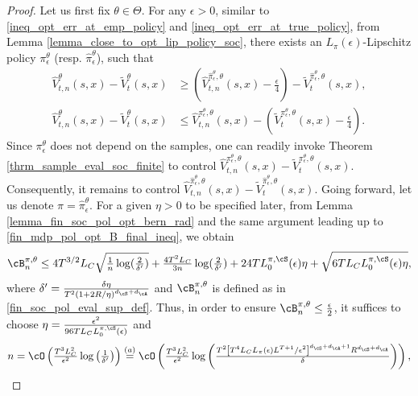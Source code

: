 \documentclass[9pt]{article}
\numberwithin{equation}{section}
\begin{document}
\begin{proof}
    Let us first fix $\theta \in \Theta$. For any $\epsilon > 0$,  similar to \eqref{ineq_opt_err_at_emp_policy} and \eqref{ineq_opt_err_at_true_policy}, from Lemma \ref{lemma_close_to_opt_lip_policy_soc}, there exists an $L_\pi(\epsilon)$-Lipschitz policy $\pi_\epsilon^\theta$ (resp. $\hat{\pi}_\epsilon^\theta$), such that
    \begin{align}
        \hat{V}_{t,n}^{\theta}(s,x) - \tilde{V}_t^{\theta}(s,x) & \geq (\hat{V}_{t,n}^{\hat{\pi}_\epsilon^\theta, \theta}(s,x) - \tfrac{\epsilon}{4}) - \tilde{V}_t^{\hat{\pi}_\epsilon^\theta, \theta}(s,x), \label{fin_soc_pol_opt_close_comp_emp} \\
        \hat{V}_{t,n}^{\theta}(s,x) - \tilde{V}_t^{\theta}(s,x) & \leq \hat{V}_{t,n}^{\pi_\epsilon^\theta, \theta}(s,x)  - (\tilde{V}_t^{\pi_\epsilon^\theta, \theta}(s,x) - \tfrac{\epsilon}{4}). \label{fin_soc_pol_opt_close_comp_real}
    \end{align}
    Since $\pi_\epsilon^\theta$ does not depend on the samples, 
    one can readily invoke Theorem \ref{thrm_sample_eval_soc_finite} to control 
    $\hat{V}_{t,n}^{\pi_\epsilon^\theta, \theta}(s,x)  - \tilde{V}_t^{\pi_\epsilon^\theta, \theta}(s,x)$.
    Consequently, it remains  to control $\hat{V}_{t,n}^{\hat{\pi}_\epsilon^\theta, \theta}(s,x)  - \tilde{V}_t^{\hat{\pi}_\epsilon^\theta, \theta}(s,x)$. 
    Going forward, let us denote $\pi = \hat{\pi}_\epsilon^\theta$.
    For a given $\eta > 0$ to be specified later, from Lemma \ref{lemma_fin_soc_pol_opt_bern_rad} and the same argument leading up to \eqref{fin_mdp_pol_opt_B_final_ineq}, we obtain
    \begin{align}
        \cB_n^{\pi, \theta} \leq 4T^{3/2}L_C\sqrt{\tfrac{1}{n} \log(\tfrac{2}{\delta'})} + \tfrac{4T^2 L_C}{3n} \log(\tfrac{2}{\delta'}) + 24TL_0^{\pi, \cS}(\epsilon) \eta + \sqrt{6 T L_C L_0^{\pi, \cS}(\epsilon) \eta}, \nonumber
    \end{align}
    where $\delta' = \tfrac{\delta \eta}{T^2 (1+2R/\eta)^{d_\cS + d_\cA}}$ and $\cB_n^{\pi, \theta}$ is defined as in \eqref{fin_soc_pol_eval_sup_def}. Thus, in order to ensure $\cB_n^{\pi, \theta} \leq \tfrac{\epsilon}{2}$, it suffices to choose $\eta = \tfrac{\epsilon^2}{96 T L_C L_0^{\pi, \cS}(\epsilon)}$ and
    \begin{align}
        n = \cO \left( \tfrac{T^3 L_C^2}{\epsilon^2} \log \left(\tfrac{1}{\delta'} \right)\right) \overset{(a)}{=} \cO \left( \tfrac{T^3 L_C^2}{\epsilon^2} \log \left(\tfrac{T^2 \left[T^4 L_C L_\pi(\epsilon)L^{T+1}/\epsilon^2\right]^{d_\cS + d_\cA + 1} R^{d_\cS + d_\cA}}{\delta} \right)\right), \label{soc_sample_opt_raw}

\end{align}
\end{proof}
\end{document}
